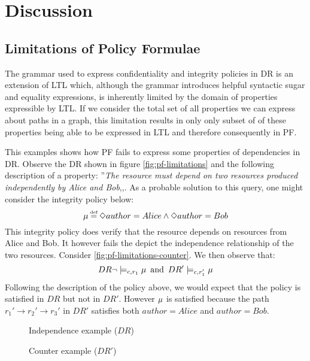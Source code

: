 \section{Discussion}\label{sec:discussion}
\subsection{Limitations of Policy Formulae}
The grammar used to express confidentiality and integrity policies in DR is an extension of LTL which, although the grammar introduces helpful syntactic sugar and equality expressions, is inherently limited by the domain of properties expressible by LTL. If we consider the total set of all properties we can express about paths in a graph, this limitation results in only only subset of of these properties being able to be expressed in LTL and therefore consequently in PF.

\begin{example}[Limitations of PF]
    \label{ex:limitations-of-pf}
    This examples shows how PF fails to express some properties of dependencies in DR. Observe the DR shown in figure \ref{fig:pf-limitations} and the following description of a property: ''\emph{The resource must depend on two resources produced independently by Alice and Bob},,. As a probable solution to this query, one might consider the integrity policy below:
    \begin{equation*}
        \inte \eqdef \F author = Alice \land \F author = Bob
    \end{equation*}
    This integrity policy does verify that the resource depends on resources from Alice and Bob. It however fails the depict the independence relationship of the two resources. Consider \autoref{fig:pf-limitations-counter}. We then observe that:
    \begin{equation*}
        DR \lnot \models_{c,r_1} \mu \enskip \text{and} \enskip DR' \models_{c,r_1'} \mu
    \end{equation*}
    Following the description of the policy above, we would expect that the policy is satisfied in $DR$ but not in $DR'$. However $\mu$ is satisfied because the path $r_1' \longrightarrow r_2' \longrightarrow r_3'$ in $DR'$ satisfies both $author = Alice$ and $author = Bob$.
    \begin{figure}[!ht]
    \begin{minipage}{.6\textwidth}
        \centering
        
        \caption{Independence example ($DR$)}
        \label{fig:pf-limitations}
    \end{minipage}%
    \begin{minipage}{0.4\textwidth}
        \centering
        
        \caption{Counter example ($DR'$)}
        \label{fig:pf-limitations-counter}
    \end{minipage}
    \end{figure}
\end{example}

